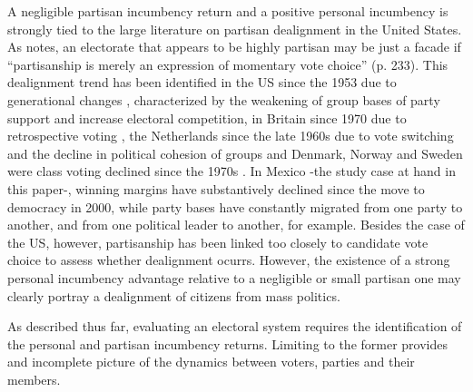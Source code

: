 \documentclass[12pt]{amsart}
\numberwithin{equation}{section}
\theoremstyle{definition}
\theoremstyle{definition}
\theoremstyle{definition}
\begin{document}
A negligible partisan incumbency return and a positive personal incumbency is strongly tied to the large literature on partisan dealignment in the United States. As \citet{beck_1985} notes, an electorate that appears to be highly partisan may be just a facade if ``partisanship is merely an expression of momentary vote choice'' (p. 233). This dealignment trend has been identified in the US since the 1953 due to generational changes \citep{beck_1977, norpoth_rusk_1982}, characterized by the weakening of group bases of party support and increase electoral competition, in Britain since 1970 due to retrospective voting \citep{alt_1977}, the Netherlands since the late 1960s due to vote switching and the decline in political cohesion of groups \citep{irwin_dittrich} and Denmark, Norway and Sweden were class voting declined since the 1970s \citep{borre_1995}. In Mexico -the study case at hand in this paper-, winning margins have substantively declined since the move to democracy in 2000, while party bases have constantly migrated from one party to another, and from one political leader to another, for example. Besides the case of the US, however, partisanship has been linked too closely to candidate vote choice to assess whether dealignment ocurrs.  However, the existence of a strong personal incumbency advantage relative to a negligible or small partisan one may clearly portray a dealignment of citizens from mass politics. 
   
As described thus far, evaluating an electoral system requires the identification of the personal and partisan incumbency returns. Limiting to the former provides and incomplete picture of the dynamics between voters, parties and their members. 
\end{document}
